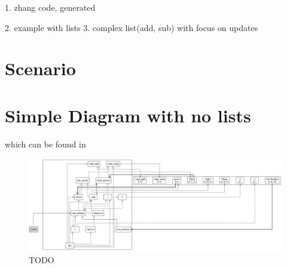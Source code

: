 1. zhang code, generated

2. example with lists
3. complex list(add, sub) with focus on updates

\section{Scenario}
\section{Simple Diagram with no lists}
which can be found in 
\begin{figure}[H]
    \includegraphics[width=\textwidth]{images/diagram_test_zhang.png}
     \caption{TODO }
     \label{fig:diagram_test_zhang}
\end{figure}

